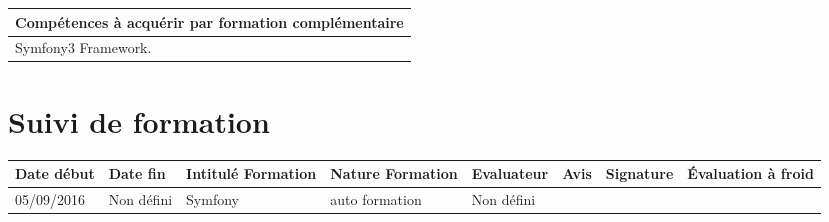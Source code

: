 \documentclass[11pt]{article}
\begin{document}
\begin{table}[!hp]
\centering
	\begin{tabularx}{\linewidth}{|X|}
	\hline
	\rowcolor{gray!40} Compétences à acquérir par formation complémentaire \\
	\hline
	Symfony3 Framework.  \\
	\hline
	\end{tabularx}
\end{table}

\section*{\large Suivi de formation}

\centering
	\begin{longtable}{|p{}|p{}|p{}|p{}|p{}|p{}|p{}|p{}|}
	\hline
	\rowcolor{gray!40} \tiny Date début & \tiny Date fin & \tiny Intitulé Formation & \tiny Nature Formation & \tiny Evaluateur & \tiny Avis & \tiny Signature & \tiny Évaluation à froid \\
	\hline
	05/09/2016 & Non défini & Symfony & auto formation & Non défini & & &  \\
	\hline
	\end{longtable}
\end{document}

